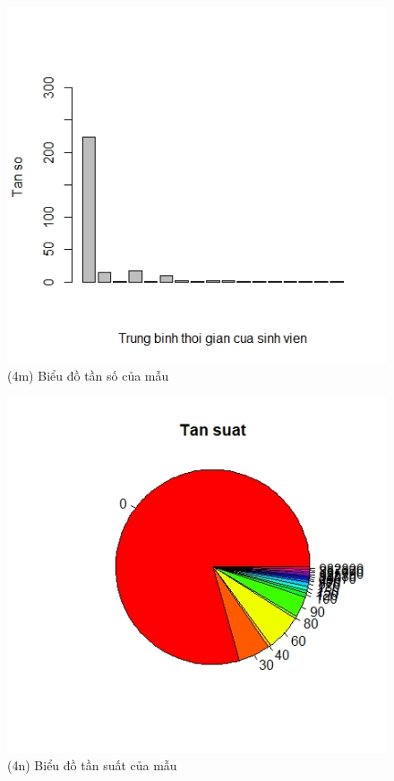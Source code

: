 \documentclass[a4paper]{article}
\theoremstyle{definition}
\begin{document}
\begin{figure}[!ht]
    \centering
    \includegraphics[scale=0.4]{Pics/q4m-file2.jpeg}
    \caption{(4m) Biểu đồ tần số của mẫu}
    \label{fig:my_label}
\end{figure}
\begin{figure}[!ht]
    \centering
    \includegraphics[scale=0.4]{Pics/q4n-file2.jpeg}
    \caption{(4n) Biểu đồ tần suất của mẫu}
    \label{fig:my_label}
\end{figure}
\end{document}
